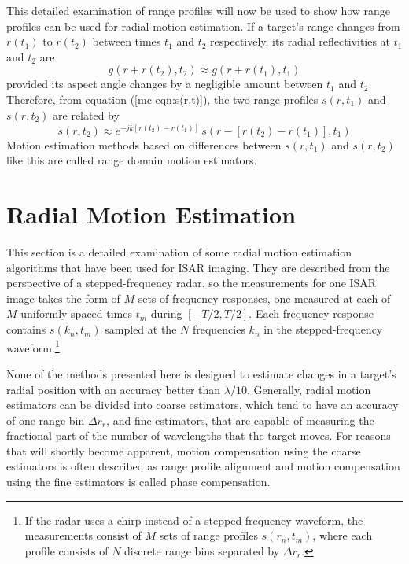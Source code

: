 This detailed examination of range profiles will now be used to show how
range profiles can be used for radial motion estimation.  If a target's 
range changes from $r(t_1)$ to $r(t_2)$ between times $t_1$ and $t_2$ 
respectively, its radial reflectivities at $t_1$ and $t_2$ are 
\begin{equation}
g(r+r(t_2),t_2)\approx g(r+r(t_1),t_1)
\end{equation}
provided its aspect angle changes by a negligible amount between $t_1$
and $t_2$.  Therefore, from equation (\ref{mc eqn:s(r,t)}), the two range 
profiles $s(r,t_1)$ and $s(r,t_2)$ are related by
\begin{equation}\label{mc eqn:rp change}
s(r,t_2)\approx e^{-j\overline{k}[r(t_2)-r(t_1)]}\,s(r-[r(t_2)-r(t_1)],t_1)
\end{equation}
Motion estimation methods based on differences between $s(r,t_1)$ and
$s(r,t_2)$ like this are called range domain motion estimators.


\section{Radial Motion Estimation}
\label{mc sec:me algs}

This section is a detailed examination of some radial motion estimation
algorithms that have been used for ISAR imaging.  They are described from
the perspective of a stepped-frequency radar, so the measurements for one
ISAR image takes the form of $M$ sets of frequency responses, one measured 
at each of 
$M$ uniformly spaced times $t_m$ during $[-T/2,T/2]$.  Each frequency
response contains $s(k_n,t_m)$ sampled at the $N$ frequencies $k_n$ in the
stepped-frequency waveform.\footnote{If the radar uses a chirp instead of a
stepped-frequency waveform, the measurements consist of $M$ sets of range
profiles $s(r_n,t_m)$, where each profile consists of $N$ discrete range bins
separated by $\Delta r_r$.}

None of the methods presented here is designed to estimate changes in a
target's radial position with an accuracy better than $\lambda/10$. 
Generally, radial motion estimators can be divided into coarse estimators,
which tend to have an accuracy of one range bin $\Delta r_r$, and fine
estimators, that are capable of measuring the fractional part of the number
of wavelengths that the target moves.  For reasons that will shortly become
apparent, motion compensation using the coarse estimators is often described 
as range profile alignment and motion compensation using the fine estimators is
called phase compensation.

